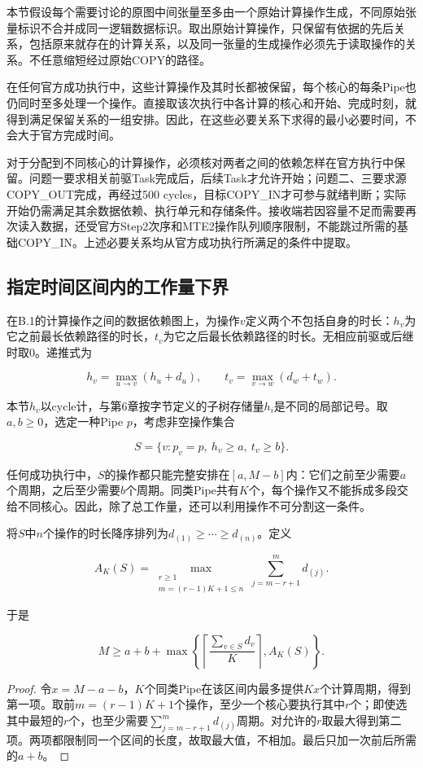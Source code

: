 \documentclass[anonymous,notoc]{gmcm2026}
\begin{document}
本节假设每个需要讨论的原图中间张量至多由一个原始计算操作生成，不同原始张量标识不合并成同一逻辑数据标识。取出原始计算操作，只保留有依据的先后关系，包括原来就存在的计算关系，以及同一张量的生成操作必须先于读取操作的关系。不任意缩短经过原始COPY的路径。

在任何官方成功执行中，这些计算操作及其时长都被保留，每个核心的每条Pipe也仍同时至多处理一个操作。直接取该次执行中各计算的核心和开始、完成时刻，就得到满足保留关系的一组安排。因此，在这些必要关系下求得的最小必要时间，不会大于官方完成时间。

对于分配到不同核心的计算操作，必须核对两者之间的依赖怎样在官方执行中保留。问题一要求相关前驱Task完成后，后续Task才允许开始；问题二、三要求源COPY\_OUT完成，再经过500 cycles，目标COPY\_IN才可参与就绪判断；实际开始仍需满足其余数据依赖、执行单元和存储条件。接收端若因容量不足而需要再次读入数据，还受官方Step2次序和MTE2操作队列顺序限制，不能跳过所需的基础COPY\_IN。上述必要关系均从官方成功执行所满足的条件中提取。

\subsection{指定时间区间内的工作量下界}

在B.1的计算操作之间的数据依赖图上，为操作\(v\)定义两个不包括自身的时长：\(h_v\)为它之前最长依赖路径的时长，\(t_v\)为它之后最长依赖路径的时长。无相应前驱或后继时取0。递推式为

\[h_v=\max_{u\to v}(h_u+d_u),\qquad t_v=\max_{v\to w}(d_w+t_w).\]

本节\(h_v\)以cycle计，与第6章按字节定义的子树存储量\(h_i\)是不同的局部记号。取\(a,b\ge0\)，选定一种Pipe \(p\)，考虑非空操作集合

\[S=\{v:p_v=p,\ h_v\ge a,\ t_v\ge b\}.\]

任何成功执行中，\(S\)的操作都只能完整安排在\([a,M-b]\)内：它们之前至少需要\(a\)个周期，之后至少需要\(b\)个周期。同类Pipe共有\(K\)个，每个操作又不能拆成多段交给不同核心。因此，除了总工作量，还可以利用操作不可分割这一条件。

将\(S\)中\(n\)个操作的时长降序排列为\(d_{(1)}\ge\cdots\ge d_{(n)}\)。定义

\[A_K(S)=\max_{\substack{r\ge1\\m=(r-1)K+1\le n}}\sum_{j=m-r+1}^{m}d_{(j)}.\]

于是

\[M\ge a+b+\max\left\{\left\lceil\frac{\sum_{v\in S}d_v}{K}\right\rceil,A_K(S)\right\}.\]

\begin{proof} 令\(x=M-a-b\)，\(K\)个同类Pipe在该区间内最多提供\(Kx\)个计算周期，得到第一项。取前\(m=(r-1)K+1\)个操作，至少一个核心要执行其中\(r\)个；即使选其中最短的\(r\)个，也至少需要\(\sum_{j=m-r+1}^{m}d_{(j)}\)周期。对允许的\(r\)取最大得到第二项。两项都限制同一个区间的长度，故取最大值，不相加。最后只加一次前后所需的\(a+b\)。\end{proof}
\end{document}
